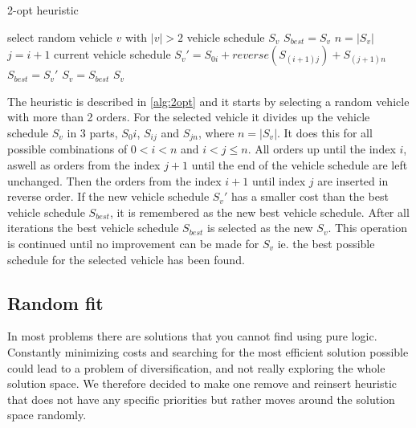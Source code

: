 \documentclass[../main.tex]{subfiles}
\begin{document}
\begin{algorithm}
    \caption{2-opt heuristic}\label{alg:2opt}
    \begin{algorithmic}[1]
        \State select random vehicle $v$ with $|v|>2$
        \State vehicle schedule $S_v$
        \Repeat
        \State $S_{best} = S_v$
        \State $n = |S_v|$
            \State $j=i+1$
                \State current vehicle schedule $S_v' = S_{0i} + reverse(S_{(i+1)j}) + S_{(j+1)n}$ 
                \State $S_{best} = S_v'$
                \EndIf
            \EndFor
        \EndFor
        \State $S_v = S_{best}$
        \State 
        \Return $S_v$
        \EndFunction
    \end{algorithmic}
\end{algorithm}


The heuristic is described in \cref{alg:2opt} and it starts by selecting a random vehicle with more than 2 orders.
For the selected vehicle it divides up the vehicle schedule $S_v$ in 3 parts, $S_0i$, $S_{ij}$ and $S_{jn}$, where $n=|S_v|$. It does this for all possible combinations of $0<i<n$ and $i<j\leq n$.
All orders up until the index $i$, aswell as orders from the index $j+1$ until the end of the vehicle schedule are left unchanged.
Then the orders from the index $i+1$ until index $j$ are inserted in reverse order.
If the new vehicle schedule $S_v'$ has a smaller cost than the best vehicle schedule $S_{best}$, it is remembered as the new best vehicle schedule. 
After all iterations the best vehicle schedule $S_{best}$ is selected as the new $S_v$.
This operation is continued until no improvement can be made for $S_v$ ie. the best possible schedule for the selected vehicle has been found.

\subsection{Random fit}
\label{sec:rand}
In most problems there are solutions that you cannot find using pure logic. 
Constantly minimizing costs and searching for the most efficient solution possible could lead to a problem of diversification, and not really exploring the whole solution space. 
We therefore decided to make one remove and reinsert heuristic that does not have any specific priorities but rather moves around the solution space randomly. 
\end{document}
